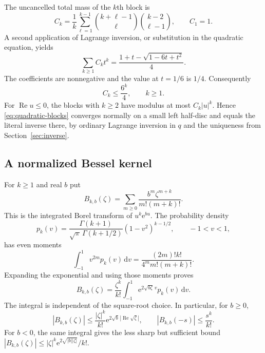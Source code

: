 \documentclass[11pt,a4paper]{article}
\numberwithin{equation}{section}
\theoremstyle{definition}
\theoremstyle{remark}
\newcommand{\ee}{\mathrm e}
\newcommand{\dd}{\mathrm d}
\newcommand{\Ree}{\operatorname{Re}}
\begin{document}
The uncancelled total mass of the $k$th block is
\begin{equation}
 C_k=\frac1k\sum_{\ell=1}^{k-1}
       \binom{k+\ell-1}{\ell}\binom{k-2}{\ell-1},\qquad C_1=1.
 \label{eq:mass}
\end{equation}
A second application of Lagrange inversion, or substitution in the
quadratic equation, yields
\begin{equation}
 \sum_{k\ge1}C_kt^k
   =\frac{1+t-\sqrt{1-6t+t^2}}4.
 \label{eq:mass-gf}
\end{equation}
The coefficients are nonnegative and the value at $t=1/6$ is $1/4$.
Consequently
\begin{equation}
 C_k\le\frac{6^k}{4},\qquad k\ge1.
 \label{eq:mass-bound}
\end{equation}
For $\Ree u\le0$, the blocks with $k\ge2$ have modulus at most
$C_k|u|^k$.  Hence \eqref{eq:quadratic-blocks} converges normally on a
small left half-disc and equals the literal inverse there, by ordinary
Lagrange inversion in $q$ and the uniqueness from
Section~\ref{sec:inverse}.

\subsection{A normalized Bessel kernel}
For $k\ge1$ and real $b$ put
\begin{equation}
 B_{k,b}(\zeta)=\sum_{m\ge0}
      \frac{b^m\zeta^{m+k}}{m!(m+k)!}.
 \label{eq:one-borel-block}
\end{equation}
This is the integrated Borel transform of $u^k\ee^{bu}$.
The probability density
\[
 p_k(v)=\frac{\Gamma(k+1)}{\sqrt\pi\,\Gamma(k+1/2)}
             (1-v^2)^{k-1/2},\qquad -1<v<1,
\]
has even moments
\[
 \int_{-1}^1v^{2m}p_k(v)\,\dd v
       =\frac{(2m)!k!}{4^m m!(m+k)!}.
\]
Expanding the exponential and using those moments proves
\begin{equation}
 B_{k,b}(\zeta)=\frac{\zeta^k}{k!}
        \int_{-1}^1\ee^{2\sqrt{b\zeta}\,v}p_k(v)\,\dd v.
 \label{eq:bessel-integral}
\end{equation}
The integral is independent of the square-root choice.  In particular,
for $b\ge0$,
\begin{equation}
 |B_{k,b}(\zeta)|\le\frac{|\zeta|^k}{k!}
          \ee^{2\sqrt b\,|\Ree\sqrt\zeta|},\qquad
 |B_{k,b}(-s)|\le\frac{s^k}{k!}.
 \label{eq:bessel-bounds}
\end{equation}
For $b<0$, the same integral gives the less sharp but sufficient bound
$|B_{k,b}(\zeta)|\le |\zeta|^k\ee^{2\sqrt{|b||\zeta|}}/k!$.
\end{document}
